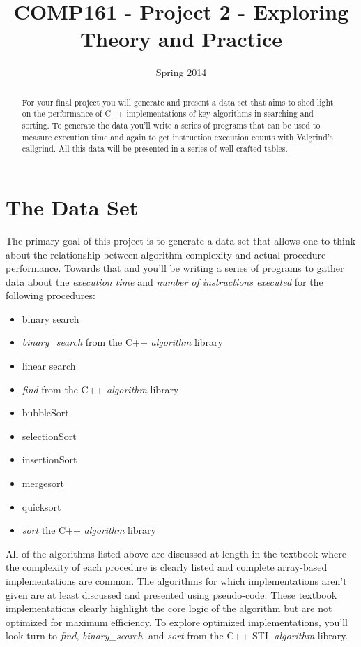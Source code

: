 \documentclass[]{tufte-handout}
\title{COMP161 - Project 2 - Exploring Theory and Practice}
\author{}
\date{Spring 2014}
\begin{document}
\maketitle

\begin{abstract}
For your final project you will generate and present a data set that aims to shed light on the performance of C++ implementations of key algorithms in searching and sorting. To generate the data you'll write a series of programs that can be used to measure execution time and again to get instruction execution counts with Valgrind's callgrind.  All this data will be presented in a series of well crafted tables.
\end{abstract}

\section{The Data Set}

The primary goal of this project is to generate a data set that allows one to think about the relationship between algorithm complexity and actual procedure performance. Towards that and you'll be writing a series of programs to gather data about the \textit{execution time} and \textit{number of instructions executed} for the following procedures:
\begin{itemize}
\item binary search 
\item  \textit{binary\_search} from the C++ \textit{algorithm} library 
\item linear search 
\item  \textit{find} from the C++ \textit{algorithm} library
\item  bubbleSort 
\item selectionSort 
\item insertionSort 
\item mergesort 
\item quicksort 
\item \textit{sort} the C++ \textit{algorithm} library 
\end{itemize}


All of the algorithms listed above are discussed at length in the textbook where the complexity of each procedure is clearly listed and complete array-based implementations are common. The algorithms for which implementations aren't given  are at least discussed and presented using pseudo-code.  These textbook implementations clearly highlight the core logic of the algorithm but are not optimized for maximum efficiency. To explore optimized implementations, you'll look turn to \textit{find}, \textit{binary\_search}, and \textit{sort} from the C++ STL \textit{algorithm} library. 
\end{document}

